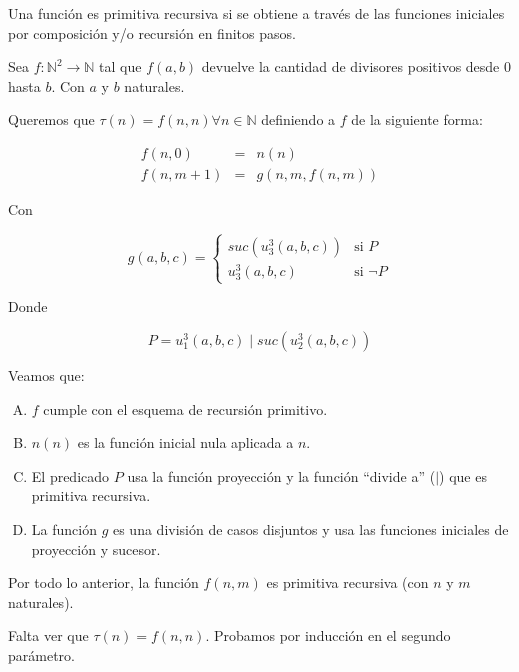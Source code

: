 \begin{questions}
\begin{solution}

Una función es primitiva recursiva si se obtiene a través de las funciones iniciales por composición y/o recursión en finitos pasos.

Sea $f:\mathbb{N}^2 \to \mathbb{N}$ tal que $f(a,b)$ devuelve la cantidad de divisores positivos desde $0$ hasta $b$. Con $a$ y $b$ naturales.

Queremos que $\tau(n) = f(n,n) \forall n \in \mathbb{N}$ definiendo a $f$ de la siguiente forma:

\begin{eqnarray*}
f(n,0)&=&n(n) \\
f(n,m+1)&=&g(n,m,f(n,m))
\end{eqnarray*}

Con 

\begin{equation*}
g(a,b,c) = \left\{ \begin{matrix} 
  suc(u^3_3(a,b,c)) & \text{si } P \\ 
  u^3_3(a,b,c) & \text{si } \neg P 
\end{matrix} \right.
\end{equation*}

Donde 

\begin{equation*}
 P = u^3_1(a,b,c) \mid suc(u^3_2(a,b,c))
\end{equation*}

Veamos que: 

\begin{enumerate}[A)]
 \setlength\itemsep{0em}
  \item $f$ cumple con el esquema de recursión primitivo.
  \item $n(n)$ es la función inicial nula aplicada a $n$.
  \item El predicado $P$ usa la función proyección y la función ``divide a'' ($\mid$) que es primitiva recursiva.
  \item La función $g$ es una división de casos disjuntos y usa las funciones iniciales de proyección y sucesor.
\end{enumerate}

Por todo lo anterior, la función $f(n,m)$ es primitiva recursiva (con $n$ y $m$ naturales).

Falta ver que $\tau (n) = f(n,n)$. Probamos por inducción en el segundo parámetro.


\end{solution}
\end{questions}
